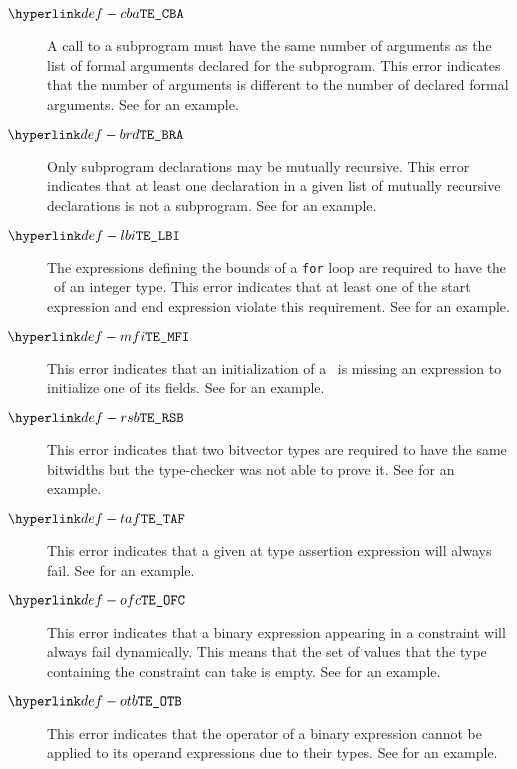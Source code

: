 \begin{description}
\hypertarget{def-cba}{}
\item[$\CallBadArity$]
A call to a subprogram must have the same number of arguments as the list of formal arguments
declared for the subprogram.
This error indicates that the number of arguments is different to the number of declared formal arguments.
See  for an example.

\hypertarget{def-brd}{}
\item[$\BadRecursiveDecls$]
Only subprogram declarations may be mutually recursive.
This error indicates that at least one declaration in a given list of mutually recursive declarations
is not a subprogram.
See  for an example.

\hypertarget{def-lbi}{}
\item[$\RequireIntegerForLoopBounds$]
The expressions defining the bounds of a \texttt{for} loop are required to have the \structure\ of
an integer type.
This error indicates that at least one of the start expression and end expression violate this
requirement.
See  for an example.

\hypertarget{def-mfi}{}
\item[$\MissingFieldInitializer$]
This error indicates that an initialization of a \structuredtype\ is missing an expression to initialize
one of its fields.
See  for an example.

\hypertarget{def-rsb}{}
\item[$\RequireSameBitwidths$]
This error indicates that two bitvector types are required to have the same bitwidths but the type-checker
was not able to prove it.
See  for an example.

\hypertarget{def-taf}{}
\item[$\TypeAsssertionFails$]
This error indicates that a given at type assertion expression will always fail.
See  for an example.

\hypertarget{def-ofc}{}
\item[$\BinaryOperationFailsAllConstraints$]
This error indicates that a binary expression appearing in a constraint will always fail dynamically.
This means that the set of values that the type containing
the constraint can take is empty.
See  for an example.

\hypertarget{def-otb}{}
\item[$\InvalidOperandTypesForBinop$]
This error indicates that the operator of a binary expression cannot be applied to its operand expressions
due to their types.
See  for an example.


\end{description}
